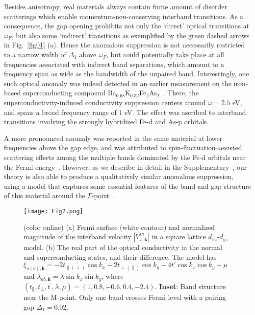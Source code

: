 \documentclass[prl,floatfix,twocolumn,showpacs,amsmath,superscriptaddress]{revtex4-2}
\renewcommand{\vec}[1]{\mathbf{#1}}
\newcommand{\vk}{{\vec{k}}}
\begin{document}
Besides anisotropy, real materials always contain finite amount of disorder scatterings which enable momentum-non-conserving interband transitions. As a consequence, the gap opening prohibits not only the `direct' optical transitions at $\omega_F$, but also some `indirect' transitions as exemplified by the green dashed arrows in Fig.~\ref{fig01} (a). Hence the anomalous suppression is not necessarily restricted to a narrow width of $\Delta_1$ above $\omega_F$, but could potentially take place at all frequencies associated with indirect band separations, which amount to a frequency span as wide as the bandwidth of the unpaired band. Interestingly, one such optical anomaly was indeed detected in an earlier measurement on the iron-based superconducting compound Ba$_{0.68}$K$_{0.32}$Fe$_{2}$As$_2$~\cite{Charnukha:10}. There, the superconductivity-induced conductivity suppression centers around $\omega=2.5$ eV, and spans a broad frequency range of 1 eV. The effect was ascribed to interband transitions involving the strongly hybridized Fe-d and As-p orbitals. 

A more pronounced anomaly was reported in the same material at lower frequencies above the gap edge, and was attributed to spin-fluctuation–assisted scattering effects among the multiple bands dominated by the Fe-d orbitals near the Fermi energy~\cite{CharnukhaPRB}. However, as we describe in detail in the Supplementary~\cite{Supp}, our theory is also able to produce a qualitatively similar anomalous suppression, using a model that captures some essential features of the band and gap structure of this material around the $\Gamma$-point~\cite{Ding:2011}. 

\begin{figure}
	\texttt{[image: Fig2.png]}
	\caption{(color online) (a) Fermi surface (white contour) and normalized magnitude of the interband velocity $|V^{12}_{x,\vk}|$ in a square lattice $d_{xz}$-$d_{yz}$ model. (b) The real part of the optical conductivity in the normal and superconducting states, and their difference. The model has $\xi_{a(b),\vk}=-2t_{\parallel(\perp)}\cos k_x-2t_{\perp(\parallel)}\cos k_y-4t'\cos k_x\cos k_y-\mu$ and $\lambda_{ab,\vk}=\lambda \sin k_x \sin k_y$, where $(t_{\parallel}, t_{\perp}, t^\prime,\lambda,\mu)=(1,0.8,-0.6,0.4,-2.4)$. {\bf Inset}: Band structure near the M-point. Only one band crosses Fermi level with a pairing gap $\Delta_1=0.02$.}
	\label{fig02}
\end{figure}
\end{document}
